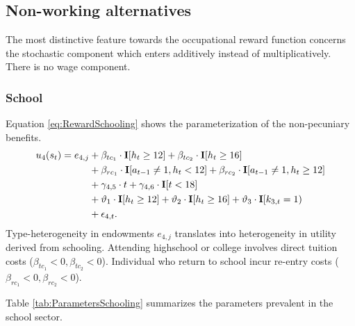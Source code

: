 
\FloatBarrier\subsection*{Non-working alternatives}
The most distinctive feature towards the occupational reward function concerns the stochastic component which enters additively instead of multiplicatively. There is no wage component.
\FloatBarrier\subsubsection{School}
Equation \ref{eq:RewardSchooling} shows the parameterization of the non-pecuniary benefits.
%
\begin{align}\label{eq:RewardSchooling}
	u_{4}(s_t) = e_{4,j} & + \beta_{tc_1} \cdot {\textbf{I}}[h_t \geq 12] + \beta_{tc_2} \cdot {\textbf{I}}[h_t \geq 16] 														\nonumber \\
    							  & + \beta_{rc_1} \cdot {\textbf{I}}[a_{t-1} \neq 1, h_t < 12] + \beta_{rc_2} \cdot {\textbf{I}}[a_{t-1} \neq 1, h_t \geq 12] 			   \nonumber \\
    							  & + \gamma_{4,5} \cdot t + \gamma_{4,6} \cdot {\textbf{I}}[t < 18] 																					  \nonumber \\
     							  & + \vartheta_1 \cdot {\textbf{I}}[h_t \geq 12] + \vartheta_2 \cdot {\textbf{I}}[h_t \geq 16] + \vartheta_3 \cdot {\textbf{I}}[k_{3,t} = 1) \nonumber \\
      							  & + \epsilon_{4,t}.
\end{align}
%
Type-heterogeneity in endowments $e_{4,j}$ translates into heterogeneity in utility derived from schooling. Attending highschool or college involves direct tuition costs ($\beta_{tc_1} < 0, \beta_{tc_2} <0$). Individual who return to school incur re-entry costs ($\beta_{rc_1} <0 , \beta_{rc_2} < 0$).

Table \ref{tab:ParametersSchooling} summarizes the parameters prevalent in the school sector.



